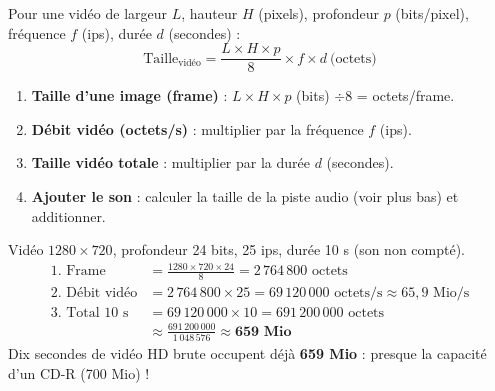 \documentclass[11pt]{article}
\begin{document}
\begin{propriete}
Pour une vidéo de largeur $L$, hauteur $H$ (pixels), profondeur $p$ (bits/pixel), fréquence $f$ (ips), durée $d$ (secondes) :
\[
\boxed{\ \text{Taille}_{\text{vidéo}} = \dfrac{L \times H \times p}{8} \times f \times d \ \text{(octets)}\ }
\]
\end{propriete}

\begin{methode}
\begin{enumerate}
  \item \textbf{Taille d'une image (frame)} : $L \times H \times p$ (bits) $\div 8$ = octets/frame.
  \item \textbf{Débit vidéo (octets/s)} : multiplier par la fréquence $f$ (ips).
  \item \textbf{Taille vidéo totale} : multiplier par la durée $d$ (secondes).
  \item \textbf{Ajouter le son} : calculer la taille de la piste audio (voir plus bas) et additionner.
\end{enumerate}
\end{methode}

\begin{exemplebox}
Vidéo $1280 \times 720$, profondeur 24 bits, 25 ips, durée 10 s (son non compté).
\begin{align*}
\text{1. Frame} &= \frac{1280 \times 720 \times 24}{8} = 2\,764\,800 \text{ octets}\\
\text{2. Débit vidéo} &= 2\,764\,800 \times 25 = 69\,120\,000 \text{ octets/s} \approx 65,9 \text{ Mio/s}\\
\text{3. Total 10 s} &= 69\,120\,000 \times 10 = 691\,200\,000 \text{ octets}\\
&\approx \frac{691\,200\,000}{1\,048\,576} \approx \textbf{659 Mio}
\end{align*}
Dix secondes de vidéo HD brute occupent déjà \textbf{659 Mio} : presque la capacité d'un CD-R (700 Mio) !
\end{exemplebox}
\end{document}
